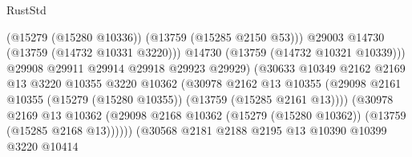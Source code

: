 \begin{lexlean}{RustStd}
\begin{coremodule}
                                                (@15279 (@15280 @10336))
                                                (@13759 (@15285 @2150 @53)))
                                              @29003
                                              @14730
                                              (@13759 (@14732 @10331 @3220)))
                                            @14730
                                            (@13759 (@14732 @10321 @10339)))
                                          @29908
                                          @29911
                                          @29914
                                          @29918
                                          @29923
                                          @29929)
                                        (@30633
                                          @10349
                                          @2162
                                          @2169
                                          @13
                                          @3220
                                          @10355
                                          @3220
                                          @10362
                                          (@30978
                                            @2162
                                            @13
                                            @10355
                                            (@29098
                                              @2161
                                              @10355
                                              (@15279 (@15280 @10355))
                                              (@13759 (@15285 @2161 @13))))
                                          (@30978
                                            @2169
                                            @13
                                            @10362
                                            (@29098
                                              @2168
                                              @10362
                                              (@15279 (@15280 @10362))
                                              (@13759 (@15285 @2168 @13))))))
                                      (@30568
                                        @2181
                                        @2188
                                        @2195
                                        @13
                                        @10390
                                        @10399
                                        @3220
                                        @10414

\end{coremodule}
\end{lexlean}
